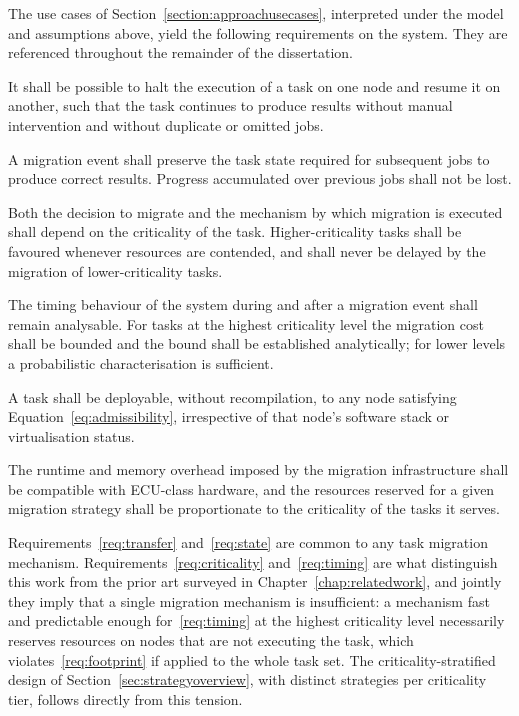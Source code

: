 The use cases of Section~\ref{section:approachusecases}, interpreted under the
model and assumptions above, yield the following requirements on the system.
They are referenced throughout the remainder of the dissertation.

\begin{description}
	It shall be possible to halt the execution of a task on one node and
	resume it on another, such that the task continues to produce results
	without manual intervention and without duplicate or omitted jobs.
	
	A migration event shall preserve the task state required for subsequent
	jobs to produce correct results. Progress accumulated over previous jobs
	shall not be lost.
	
	Both the decision to migrate and the mechanism by which migration is
	executed shall depend on the criticality of the task. Higher-criticality
	tasks shall be favoured whenever resources are contended, and shall never
	be delayed by the migration of lower-criticality tasks.
	
	The timing behaviour of the system during and after a migration event
	shall remain analysable. For tasks at the highest criticality level the
	migration cost shall be bounded and the bound shall be established
	analytically; for lower levels a probabilistic characterisation is
	sufficient.
	
	A task shall be deployable, without recompilation, to any node satisfying
	Equation~\ref{eq:admissibility}, irrespective of that node's software
	stack or virtualisation status.
	
	The runtime and memory overhead imposed by the migration infrastructure
	shall be compatible with ECU-class hardware, and the resources reserved
	for a given migration strategy shall be proportionate to the criticality
	of the tasks it serves.
\end{description}

Requirements~\ref{req:transfer} and~\ref{req:state} are common to any task
migration mechanism. Requirements~\ref{req:criticality} and~\ref{req:timing}
are what distinguish this work from the prior art surveyed in
Chapter~\ref{chap:relatedwork}, and jointly they imply that a single migration
mechanism is insufficient: a mechanism fast and predictable enough
for~\ref{req:timing} at the highest criticality level necessarily reserves
resources on nodes that are not executing the task, which
violates~\ref{req:footprint} if applied to the whole task set. The
criticality-stratified design of Section~\ref{sec:strategyoverview}, with
distinct strategies per criticality tier, follows directly from this tension.

